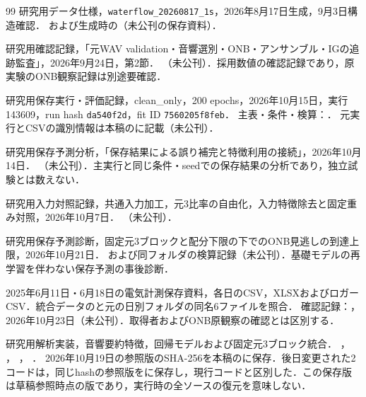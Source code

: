\begin{thebibliography}{99}
研究用データ仕様，\texttt{waterflow\_20260817\_1s}，2026年8月17日生成，9月3日構造確認．
および生成時の（未公刊の保存資料）．

研究用確認記録，「元WAV validation・音響選別・ONB・アンサンブル・IGの追跡監査」，2026年9月24日，第2節．
（未公刊）．採用数値の確認記録であり，原実験のONB観察記録は別途要確認．

研究用保存実行・評価記録，clean\_only，200 epochs，2026年10月15日，実行143609，run hash \texttt{da540f2d}，fit ID \texttt{7560205f8feb}．
主表・条件・検算：．
元実行とCSVの識別情報は本稿のに記載（未公刊）．

研究用保存予測分析，「保存結果による誤り補完と特徴利用の接続」，2026年10月14日．
（未公刊）．主実行と同じ条件・seedでの保存結果の分析であり，独立試験とは数えない．

研究用入力対照記録，共通入力加工，元3比率の自由化，入力特徴除去と固定重み対照，2026年10月7日．
（未公刊）．

研究用保存予測診断，固定元3ブロックと配分下限の下でのONB見逃しの到達上限，2026年10月21日．
および同フォルダの検算記録（未公刊）．基礎モデルの再学習を伴わない保存予測の事後診断．

2025年6月11日・6月18日の電気計測保存資料，各日のCSV，XLSXおよびロガーCSV．統合データのと元の日別フォルダの同名6ファイルを照合．
確認記録：，2026年10月23日（未公刊）．取得者およびONB原観察の確認とは区別する．

研究用解析実装，音響要約特徴，回帰モデルおよび固定元3ブロック統合．
，
，
，
．
2026年10月19日の参照版のSHA-256を本稿のに保存．後日変更された2コードは，同じhashの参照版をに保存し，現行コードと区別した．この保存版は草稿参照時点の版であり，実行時の全ソースの復元を意味しない．
\end{thebibliography}
